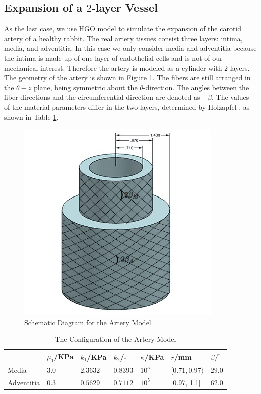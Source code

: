 \subsection{Expansion of a $2$-layer Vessel}
As the last case, we use HGO model to simulate the expansion of the carotid artery of a healthy rabbit. The real artery tissues consist three layers: intima, media, and adventitia. In this case we only consider media and adventitia because the intima is made up of one layer of endothelial cells and is not of our mechanical interest. Therefore the artery is modeled as a cylinder with $2$ layers. The geometry of the artery is shown in Figure \ref{fig:vessel_schematic3}. The fibers are still arranged in the $\theta-z$ plane, being symmetric about the $\theta$-direction. The angles between the fiber directions and the circumferential direction are denoted as $\pm\beta$. The values of the material parameters differ in the two layers, determined by Holzapfel \cite{Holzapfel2} , as shown in Table \ref{table:artery}. 

\begin{figure}[H]
\centering
\includegraphics[width=.4\textwidth]{./figures/vessel_schematic3.png}
\caption{Schematic Diagram for the Artery Model}
\label{fig:vessel_schematic3}
\end{figure}

\begin{table}[H]
\centering
\caption{The Configuration of the Artery Model}
\label{table:artery}
\begin{tabular}{ l l l l l l l}
\hline
& $\mu_1$/KPa & $k_1$/KPa & $k_2$/- & $\kappa$/KPa & $r$/mm & $\beta/^\circ$ \\
 \hline
 Media &   $3.0$ & $2.3632$ & $0.8393$ & $10^5$ & $[0.71, 0.97)$ & $29.0$\\
 Adventitia & $0.3$ & $0.5629$ & $0.7112$ & $10^5$ & [0.97, 1.1] & $62.0$\\
 \hline
\end{tabular}
\end{table}

